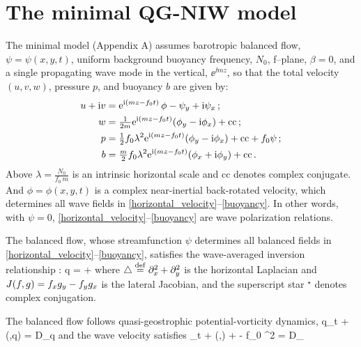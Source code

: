 \documentclass{jfm}
\begin{document}
\section{The \cite{xie_vanneste2015} minimal QG-NIW model}
The \cite{xie_vanneste2015} minimal model (Appendix A) assumes
barotropic balanced flow, $\psi=\psi(x,y,t)$,
uniform background buoyancy frequency, $N_0$, f--plane, $\beta=0$, and a single
propagating wave mode in the vertical, $\ee^{\ii m z}$, so that the
total velocity $(u,v,w)$, pressure $p$, and buoyancy $b$ are given by:
\begin{align}
\label{horizontal_velocity}
u + {\rm i} v  &= {\rm e}^{{\rm i} (m z - f_0 t)}\,\phi -\psi_y + {\rm i}\psi_x\,;\\
  \label{vertical_velocity}
  w &= \tfrac{1}{2 m}{\rm e}^{{\rm i} (m z - f_0 t)}(\phi_y-{\rm i}\phi_x)  + \text{cc}  \,;\\
\label{pressure}
\qquad p &= \tfrac{1}{2} f_0\lambda^2{\rm e}^{{\rm i} (m z - f_0 t)}(\phi_y-{\rm i}\phi_x)
+\text{cc} + f_0 \psi \,;\\
\label{buoyancy}
b &=  \tfrac{m}{2} f_0\lambda^2{\rm e}^{{\rm i} (m z - f_0 t)}(\phi_x+{\rm i}\phi_y) + \text{cc}
  \, .
\end{align}
Above $\lambda = \tfrac{N_0}{f_0\, m}$ is an intrinsic horizontal scale and cc denotes
complex conjugate. And $\phi = \phi(x,y,t)$ is a complex near-inertial back-rotated velocity,
which determines all wave fields in \eqref{horizontal_velocity}--\eqref{buoyancy}.
In other words, with $\psi=0$, \eqref{horizontal_velocity}--\eqref{buoyancy}
are wave polarization relations.

The balanced flow,
whose streamfunction $\psi$ determines all balanced fields in
\eqref{horizontal_velocity}--\eqref{buoyancy}, satisfies the
wave-averaged inversion relationship
\citep[cf. ][]{wagner_young2015}:
\beq
\label{qgpv}
q = \lap \psi +
                 \com
\eeq
where $\triangle \stackrel{\mathrm{def}}{=} \partial_x^2 + \partial_y^2$ is the horizontal
Laplacian and $J(f,g)=f_x g_y - f_y g_x$ is the lateral Jacobian, and
the superscript star $^\star$ denotes complex conjugation.

The balanced flow follows quasi-geostrophic potential-vorticity dynamics,
\beq
\label{macroturb}
q_t + \sJ(\psi,q) = D_q\com
\eeq
and the wave velocity satisfies
\beq
\label{waves}
\phi_t + \sJ(\psi,\phi) + \phi\lap \psi -  f_0 \lambda^2 \lap \phi
 = D_\phi\per
\eeq
\end{document}
